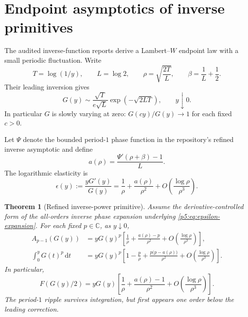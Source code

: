 \documentclass[11pt,oneside]{article}
\newtheorem{theorem}{Theorem}[section]
\theoremstyle{definition}
\theoremstyle{remark}
\newcommand{\C}{\mathbb C}
\newcommand{\dd}{\,\mathrm d}
\newcommand{\1}{\mathbf 1}
\begin{document}
\section{Endpoint asymptotics of inverse primitives}

The audited inverse-function reports derive a Lambert--$W$ endpoint law with a small periodic fluctuation.  Write
\begin{equation}\label{p5:eq:rho-definition}
 T=\log(1/y),\qquad L=\log2,
 \qquad \rho=\sqrt{\frac{2T}{L}},
 \qquad \beta=\frac1L+\frac12.
\end{equation}
Their leading inversion gives
\begin{equation}\label{p5:eq:G-leading-endpoint}
 G(y)\sim \frac{\sqrt T}{e\sqrt L}
 \exp\!\left(-\sqrt{2LT}\right),
 \qquad y\downarrow0.
\end{equation}
In particular $G$ is slowly varying at zero: $G(cy)/G(y)\to1$ for each fixed $c>0$.

Let $\Psi$ denote the bounded period-$1$ phase function in the repository's refined inverse asymptotic and define
\begin{equation}\label{p5:eq:a-rho}
 a(\rho)=\frac{\Psi'(\rho+\beta)-1}{L}.
\end{equation}
The logarithmic elasticity is
\begin{equation}\label{p5:eq:epsilon-expansion}
 \epsilon(y):=\frac{yG'(y)}{G(y)}
 =\frac1\rho+\frac{a(\rho)}{\rho^2}
 +O\!\left(\frac{\log\rho}{\rho^3}\right).
\end{equation}

\begin{theorem}[Refined inverse-power primitive]\label{p5:thm:inverse-primitive-asymptotic}
Assume the derivative-controlled form of the all-orders inverse phase expansion underlying \eqref{p5:eq:epsilon-expansion}.  For each fixed $p\in\C$, as $y\downarrow0$,
\begin{align}
 A_{p-1}(G(y))
 &=yG(y)^p\left[
 \frac1\rho+\frac{a(\rho)-p}{\rho^2}
 +O\!\left(\frac{\log\rho}{\rho^3}\right)
 \right],\label{p5:eq:A-at-G-asymptotic}\\
 \int_0^yG(t)^p\dd t
 &=yG(y)^p\left[
 1-\frac p\rho+\frac{p\bigl(p-a(\rho)\bigr)}{\rho^2}
 +O\!\left(\frac{\log\rho}{\rho^3}\right)
 \right].\label{p5:eq:inverse-primitive-refined}
\end{align}
In particular,
\begin{equation}\label{p5:eq:F-half-G-asymptotic}
 F(G(y)/2)=yG(y)\left[
 \frac1\rho+\frac{a(\rho)-1}{\rho^2}
 +O\!\left(\frac{\log\rho}{\rho^3}\right)
 \right].
\end{equation}
The period-$1$ ripple survives integration, but first appears one order below the leading correction.
\end{theorem}
\end{document}
